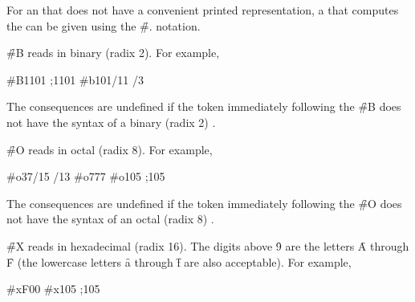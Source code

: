 For an 
that does not have a convenient printed
representation, a  that computes the  can be given using
the \f{\#.} notation.
%

\endsubsubsection%




\f{\#B} reads  in binary (radix 2).
For example, 

\code
 #B1101  ;1101\ssst
 #b101/11 /3
\endcode

The consequences are undefined if the token immediately following
the \f{\#B} does not have the syntax of a binary (\ie radix 2) .

\endsubsubsection%



\f{\#O} reads  in octal (radix 8).
For example, 

\code
 #o37/15 /13
 #o777 
 #o105  ;105\ssse
\endcode

The consequences are undefined if the token immediately following
the \f{\#O} does not have the syntax of an octal (\ie radix 8) .

\endsubsubsection%



\f{\#X} reads  in hexadecimal (radix 16).
The digits above \f{9} are the letters \f{A} through \f{F} (the lowercase
letters \f{a} through \f{f} are also acceptable).  For example,

\code
 #xF00              
 #x105  ;105\ssss
\endcode

